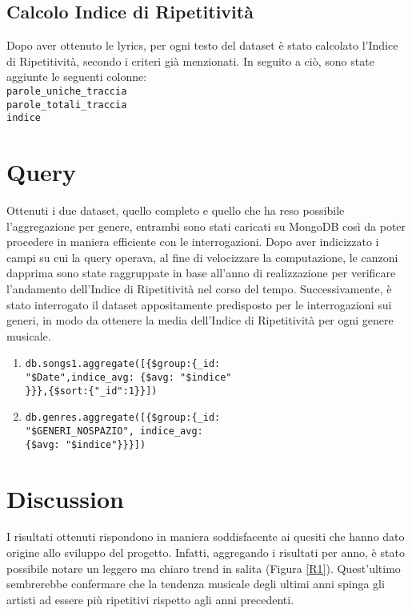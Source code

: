 \documentclass[fleqn,10pt]{SelfArx} %
\begin{document}
\subsection{Calcolo Indice di Ripetitività}

Dopo aver ottenuto le lyrics, per ogni testo del dataset è stato calcolato l’Indice di Ripetitività, secondo i criteri già menzionati. In seguito a ciò, sono state aggiunte le seguenti colonne:
\\ \texttt{parole\_uniche\_traccia \\ parole\_totali\_traccia \\ indice}

\section{Query}

Ottenuti i due dataset, quello completo e quello che ha reso possibile l’aggregazione per genere, entrambi sono stati caricati su MongoDB così da poter procedere in maniera efficiente con le interrogazioni.
Dopo aver indicizzato i campi su cui la query operava, al fine di velocizzare la computazione, le canzoni dapprima sono state raggruppate in base all’anno di realizzazione per verificare l’andamento dell’Indice di Ripetitività nel corso del tempo. Successivamente, è stato interrogato il dataset appositamente predisposto per le interrogazioni sui generi, in modo da ottenere la media dell’Indice di Ripetitività per ogni genere musicale.

\begin{enumerate}
\item \texttt{db.songs1.aggregate([\{\$group:\{\_id:\\
"\$Date",indice\_avg: \{\$avg: "\$indice"\\
\}\}\},\{\$sort:\{"\_id":1\}\}])}
\item \texttt{db.genres.aggregate([\{\$group:\{\_id:\\
"\$GENERI\_NOSPAZIO", indice\_avg:\\
\{\$avg: "\$indice"\}\}\}])}
\end{enumerate}

\section{Discussion}

I risultati ottenuti rispondono in maniera soddisfacente ai quesiti che hanno dato origine allo sviluppo del progetto. Infatti, aggregando i risultati per anno, è stato possibile notare un leggero ma chiaro trend in salita (Figura \ref{R1}). Quest’ultimo sembrerebbe confermare che la tendenza musicale degli ultimi anni spinga gli artisti ad essere più ripetitivi rispetto agli anni precedenti.
\end{document}
